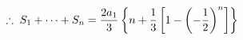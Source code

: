 \documentclass[preview]{standalone}
\begin{document}
\begin{align*}
\special{dvisvgm:raw <g id='unique000'>}\therefore\; S_1+\cdots+S_n=\frac{2a_1}{3}\left\{n+\frac{1}{3}\left[1-\left(-\frac{1}{2}\right)^n\right]\right\}\special{dvisvgm:raw </g>}
\end{align*}
\end{document}
